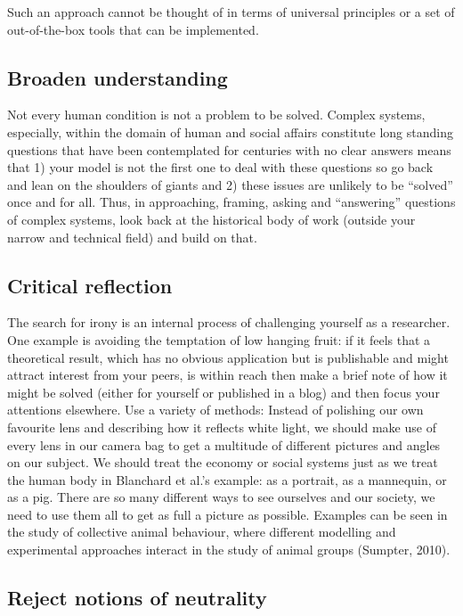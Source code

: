 Such an approach cannot be thought of in terms of universal principles or a set of out-of-the-box tools that can be implemented. 


\subsection{Broaden understanding}

Not every human condition is not a problem to be solved. Complex systems, especially, within the domain of human and social affairs constitute long standing questions that have been contemplated for centuries with no clear answers means that 1) your model is not the first one to deal with these questions so go back and lean on the shoulders of giants and 2) these issues are unlikely to be “solved” once and for all. Thus, in approaching, framing, asking and “answering” questions of complex systems, look back at the historical body of work (outside your narrow and technical field) and build on that.       



\subsection{Critical reflection}

The search for irony is an internal process of challenging yourself as a researcher. One example is avoiding the temptation of low hanging fruit: if it feels that a theoretical result, which has no obvious application but is publishable and might attract interest from your peers, is within reach then make a brief note of how it might be solved (either for yourself or published in a blog) and then focus your attentions elsewhere. 
Use a variety of methods: Instead of polishing our own favourite lens and describing how it reflects white light, we should make use of every lens in our camera bag to get a multitude of different pictures and angles on our subject. We should treat the economy or social systems just as we treat the human body in Blanchard et al.’s example: as a portrait, as a mannequin, or as a pig. There are so many different ways to see ourselves and our society, we need to use them all to get as full a picture as possible. Examples can be seen in the study of collective animal behaviour, where different modelling and experimental approaches interact in the study of animal groups (Sumpter, 2010). 




\subsection{Reject notions of neutrality}

